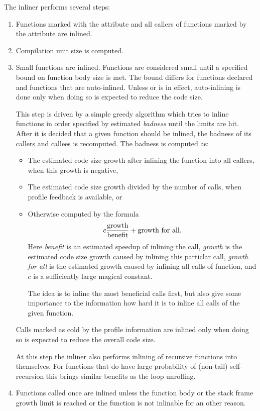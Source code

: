 \documentclass[final]{ols}
\begin{document}
The inliner performs several steps:
\begin{enumerate}
\item Functions marked with the  attribute and all callers of functions
marked by the  attribute \cite{GCCmanual} are inlined.

\item Compilation unit size is computed.
\item Small functions are inlined.  Functions are considered small until
a specified bound on function body size is met.  The bound differs for functions
declared  and functions that are auto-inlined. Unless 
or  is in effect, auto-inlining is done only when
doing so is expected to reduce the code size.

This step is driven by a simple greedy algorithm which tries to inline functions in
order specified by estimated {\em badness} until the limits are hit.  After it
is decided that a given function should be inlined, the badness of its callers and
callees is recomputed.  The badness is computed as:
\begin{itemize}
 \item The estimated code size growth after inlining the function into all callers, when this growth is negative,
 \item The estimated code size growth divided by the number of calls, when profile feedback is available, or
 \item Otherwise computed by the formula
 $$c{\hbox{growth}\over \hbox{benefit}} + \hbox{growth for all}.$$
 Here {\em benefit} is an estimated
speedup of inlining the call, {\em growth} is the estimated code size growth caused by
inlining this particlar call, {\em growth for all} is the estimated growth caused by
inlining all calls of function, and $c$ is a sufficiently large magical constant.

The idea is to inline the most beneficial calls first, but also give some
importance to the information how hard it is to inline all calls of the given
function.
\end{itemize}

Calls marked as cold by the profile information are inlined only when doing so
is expected to reduce the overall code size.

At this step the inliner also performs inlining of recursive functions into
themselves.  For functions that do have large probability of (non-tail)
self-recursion this brings similar benefits as the loop unrolling.

\item Functions called once are inlined unless the function body or the stack frame growth limit is reached
or the function is not inlinable for an other reason.
\end{enumerate}
\end{document}
